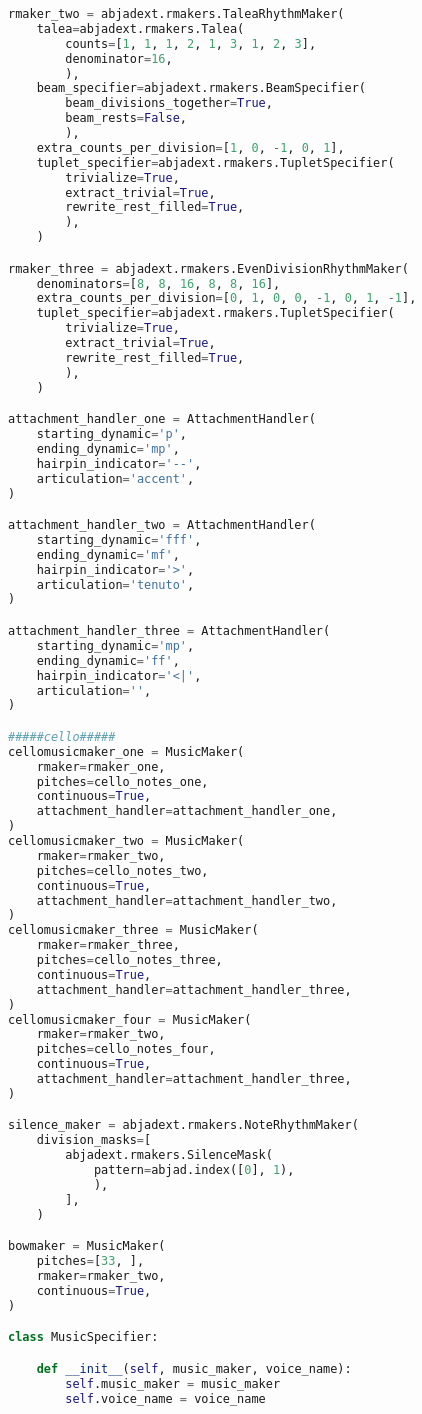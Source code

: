 \begin{lstlisting}[language=Python, caption=Cthar Segment\_I]
rmaker_two = abjadext.rmakers.TaleaRhythmMaker(
    talea=abjadext.rmakers.Talea(
        counts=[1, 1, 1, 2, 1, 3, 1, 2, 3],
        denominator=16,
        ),
    beam_specifier=abjadext.rmakers.BeamSpecifier(
        beam_divisions_together=True,
        beam_rests=False,
        ),
    extra_counts_per_division=[1, 0, -1, 0, 1],
    tuplet_specifier=abjadext.rmakers.TupletSpecifier(
        trivialize=True,
        extract_trivial=True,
        rewrite_rest_filled=True,
        ),
    )

rmaker_three = abjadext.rmakers.EvenDivisionRhythmMaker(
    denominators=[8, 8, 16, 8, 8, 16],
    extra_counts_per_division=[0, 1, 0, 0, -1, 0, 1, -1],
    tuplet_specifier=abjadext.rmakers.TupletSpecifier(
        trivialize=True,
        extract_trivial=True,
        rewrite_rest_filled=True,
        ),
    )

attachment_handler_one = AttachmentHandler(
    starting_dynamic='p',
    ending_dynamic='mp',
    hairpin_indicator='--',
    articulation='accent',
)

attachment_handler_two = AttachmentHandler(
    starting_dynamic='fff',
    ending_dynamic='mf',
    hairpin_indicator='>',
    articulation='tenuto',
)

attachment_handler_three = AttachmentHandler(
    starting_dynamic='mp',
    ending_dynamic='ff',
    hairpin_indicator='<|',
    articulation='',
)

#####cello#####
cellomusicmaker_one = MusicMaker(
    rmaker=rmaker_one,
    pitches=cello_notes_one,
    continuous=True,
    attachment_handler=attachment_handler_one,
)
cellomusicmaker_two = MusicMaker(
    rmaker=rmaker_two,
    pitches=cello_notes_two,
    continuous=True,
    attachment_handler=attachment_handler_two,
)
cellomusicmaker_three = MusicMaker(
    rmaker=rmaker_three,
    pitches=cello_notes_three,
    continuous=True,
    attachment_handler=attachment_handler_three,
)
cellomusicmaker_four = MusicMaker(
    rmaker=rmaker_two,
    pitches=cello_notes_four,
    continuous=True,
    attachment_handler=attachment_handler_three,
)

silence_maker = abjadext.rmakers.NoteRhythmMaker(
    division_masks=[
        abjadext.rmakers.SilenceMask(
            pattern=abjad.index([0], 1),
            ),
        ],
    )

bowmaker = MusicMaker(
    pitches=[33, ],
    rmaker=rmaker_two,
    continuous=True,
)

class MusicSpecifier:

    def __init__(self, music_maker, voice_name):
        self.music_maker = music_maker
        self.voice_name = voice_name


\end{lstlisting}
